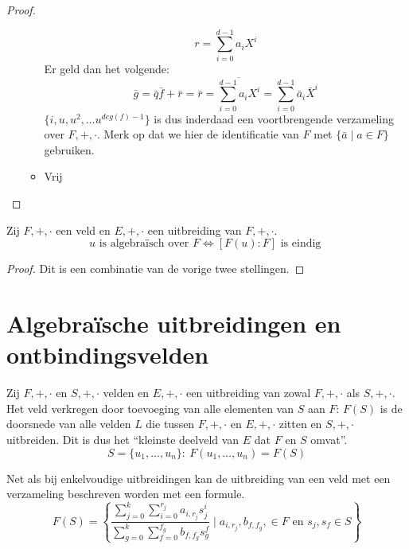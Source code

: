 \documentclass[main.tex]{subfiles}
\begin{document}
\begin{st}
\begin{proof}
\begin{itemize}
\begin{itemize}
        \[ r = \sum_{i=0}^{d-1}a_{i}X^{i} \]
        Er geld dan het volgende:\waarom
        \[ \bar{g} = \bar{q}\bar{f} + \bar{r} = \bar{r} = \overline{\sum_{i=0}^{d-1}a_{i}X^{i}} = \sum_{i=0}^{d-1}\bar{a}_{i}\bar{X}^{i} \]
        $\{ i,u,u^{2},\dotsc u^{deg(f)-1} \}$ is dus inderdaad een voortbrengende verzameling over $F,+,\cdot$.
        Merk op dat we hier de identificatie van $F$ met $\{ \bar{a}\mid a\in F\}$ gebruiken.
      \item Vrij\\
      \end{itemize}
    \end{itemize}
  \end{proof}
\end{st}

\begin{gev}
  Zij $F,+,\cdot$ een veld en $E,+,\cdot$ een uitbreiding van $F,+,\cdot$.
  \[ u \text{ is algebra\"isch over } F \Leftrightarrow [F(u):F] \text{ is eindig } \]

  \begin{proof}
    Dit is een combinatie van de vorige twee stellingen. 
  \end{proof}
\end{gev}

\section{Algebra\"ische uitbreidingen en ontbindingsvelden}
\label{sec:algebr-uitbr-en}

\begin{de}
  Zij $F,+,\cdot$ en $S,+,\cdot$ velden en $E,+,\cdot$ een uitbreiding van zowal $F,+,\cdot$ als $S,+,\cdot$.
  Het veld verkregen door toevoeging van alle elementen van $S$ aan $F$: $F(S)$ is de doorsnede van alle velden $L$ die tussen $F,+,\cdot$ en $E,+,\cdot$ zitten en $S,+,\cdot$ uitbreiden.
  Dit is dus het ``kleinste deelveld van $E$ dat $F$ en $S$ omvat''.
  \[ S = \{ u_{1},\dotsc,u_{n} \}:\ F(u_{1},\dotsc,u_{n}) = F(S) \]
\end{de}

\begin{ei}
  Net als bij enkelvoudige uitbreidingen kan de uitbreiding van een veld met een verzameling beschreven worden met een formule.
  \[
  F(S) =
  \left\{
    \dfrac
      {
        \sum_{j=0}^{k}\sum_{i=0}^{r_{j}}a_{i,r_{j}}s_{j}^{i}
      }
      {
        \sum_{g=0}^{k}\sum_{f=0}^{f_{g}}b_{f,f_{g}}s_{g}^{f}
      }
    \mid a_{i,r_{j}},b_{f,f_{g}}, \in F \text{ en } s_{j}, s_{f} \in S 
  \right\}
  \]
  \zb
\end{ei}
\end{document}
